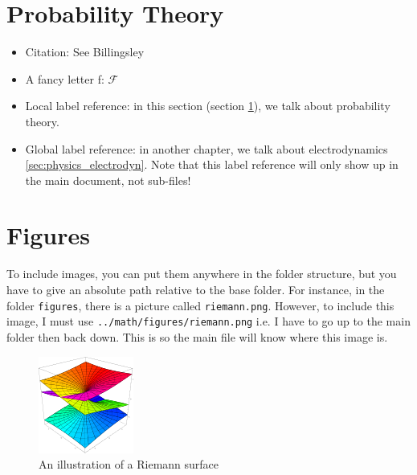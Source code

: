 \documentclass[../main/journal_template.tex]{subfiles}
\newcommand{\fancyf}{\mathscr{F}}
\begin{document}
 
\section{Probability Theory}\label{sec:math_prob_thy}
\begin{itemize}
\item Citation: See Billingsley \cite{billingsley2008probability}
\item A fancy letter f: $\fancyf$
\item Local label reference: in this section (section \ref{sec:math_prob_thy}), we talk about probability theory. 
\item Global label reference: in another chapter, we talk about electrodynamics \ref{sec:physics_electrodyn}. Note that this label reference will only show up in the main document, not sub-files! 
\end{itemize} 

\section{Figures}
To include images, you can put them anywhere in the folder structure, but you have to give an absolute path relative to the base folder.  For instance, in the folder \verb|figures|, there is a picture called \verb|riemann.png|.  However, to include this image, I must use \verb|../math/figures/riemann.png| i.e. I have to go up to the main folder then back down.  This is so the main file will know where this image is.

\begin{figure}[ht]
\begin{center}
\includegraphics[scale=1]{../math/figures/riemann.png}
\end{center}
\caption{An illustration of a Riemann surface}
\label{somefig}
\end{figure}

\end{document}

